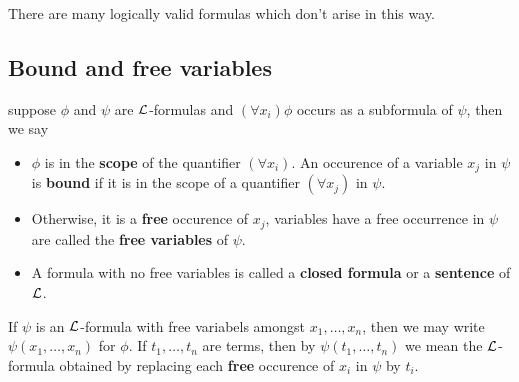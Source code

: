\documentclass{article}
\begin{document}
There are many logically valid formulas which don't arise in this way.

\subsection{Bound and free variables}

\begin{definition}
    suppose $\phi$ and $\psi$ are $\mathcal{L}$-formulas and $(\forall x_i)\phi$ occurs as a subformula of $\psi$, then we say\begin{itemize}
        \item $\phi$ is in the \textbf{scope} of the quantifier $(\forall x_i)$. An occurence of a variable $x_j$ in $\psi$ is \textbf{bound} if it is in the scope of a quantifier $(\forall x_j)$ in $\psi$.
        \item Otherwise, it is a \textbf{free} occurence of $x_j$, variables have a free occurrence in $\psi$ are called the \textbf{free variables} of $\psi$.
        \item A formula with no free variables is called a \textbf{closed formula} or a \textbf{sentence} of $\mathcal{L}$.
    \end{itemize}
\end{definition}

\begin{definition}
    If $\psi$ is an $\mathcal{L}$-formula with free variabels amongst $x_1,\ldots,x_n$, then we may write $\psi(x_1,\ldots,x_n)$ for $\phi$. If $t_1,\ldots,t_n$ are terms, then by $\psi(t_1,\ldots,t_n)$ we mean the $\mathcal{L}$-formula obtained by replacing each \textbf{free} occurence of $x_i$ in $\psi$ by $t_i$.
\end{definition}
\end{document}
